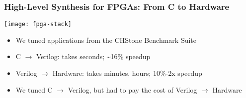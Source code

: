 \documentclass[10pt, compress, aspectratio=169]{beamer}
\begin{document}
\begin{frame}
    \frametitle{High-Level Synthesis for FPGAs: From C to Hardware}
    \begin{center}
        \texttt{[image: fpga-stack]}
    \end{center}

    \begin{itemize}
        \item We tuned applications from the \alert{CHStone Benchmark Suite}
        \item C $\rightarrow$ Verilog: takes \alert{seconds}; \alert{\textasciitilde16\% speedup}
        \item Verilog $\rightarrow$ Hardware: takes \alert{minutes}, \alert{hours}; \alert{10\%-2x speedup}
        \item We tuned C $\rightarrow$ Verilog, but had \alert{to pay the cost} of Verilog $\rightarrow$ Hardware
    \end{itemize}
\end{frame}

%
\end{document}
